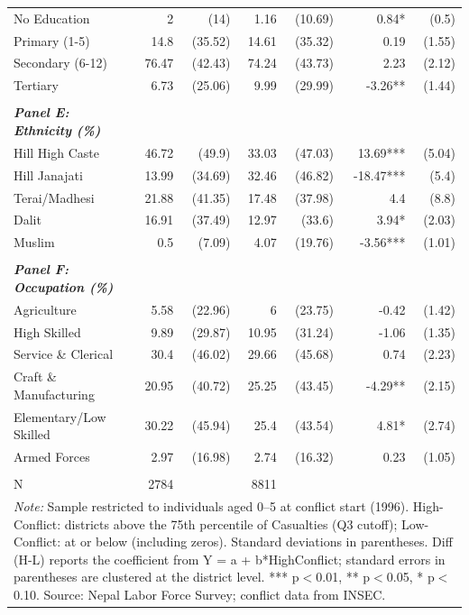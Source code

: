 \begin{landscape}
\begin{table}[!h]
{\begin{tabular}[t]{lrrrrrr}
No Education & 2 & (14) & 1.16 & (10.69) & 0.84* & (0.5)\\
Primary (1-5) & 14.8 & (35.52) & 14.61 & (35.32) & 0.19 & (1.55)\\
\addlinespace
Secondary (6-12) & 76.47 & (42.43) & 74.24 & (43.73) & 2.23 & (2.12)\\
Tertiary & 6.73 & (25.06) & 9.99 & (29.99) & -3.26** & (1.44)\\
 &  &  &  &  &  & \\
\em{\textbf{Panel E: Ethnicity (\%)}} & \em{\textbf{}} & \em{\textbf{}} & \em{\textbf{}} & \em{\textbf{}} & \em{\textbf{}} & \em{\textbf{}}\\
Hill High Caste & 46.72 & (49.9) & 33.03 & (47.03) & 13.69*** & (5.04)\\
\addlinespace
Hill Janajati & 13.99 & (34.69) & 32.46 & (46.82) & -18.47*** & (5.4)\\
Terai/Madhesi & 21.88 & (41.35) & 17.48 & (37.98) & 4.4 & (8.8)\\
Dalit & 16.91 & (37.49) & 12.97 & (33.6) & 3.94* & (2.03)\\
Muslim & 0.5 & (7.09) & 4.07 & (19.76) & -3.56*** & (1.01)\\
 &  &  &  &  &  & \\
\addlinespace
\em{\textbf{Panel F: Occupation (\%)}} & \em{\textbf{}} & \em{\textbf{}} & \em{\textbf{}} & \em{\textbf{}} & \em{\textbf{}} & \em{\textbf{}}\\
Agriculture & 5.58 & (22.96) & 6 & (23.75) & -0.42 & (1.42)\\
High Skilled & 9.89 & (29.87) & 10.95 & (31.24) & -1.06 & (1.35)\\
Service \& Clerical & 30.4 & (46.02) & 29.66 & (45.68) & 0.74 & (2.23)\\
Craft \& Manufacturing & 20.95 & (40.72) & 25.25 & (43.45) & -4.29** & (2.15)\\
\addlinespace
Elementary/Low Skilled & 30.22 & (45.94) & 25.4 & (43.54) & 4.81* & (2.74)\\
Armed Forces & 2.97 & (16.98) & 2.74 & (16.32) & 0.23 & (1.05)\\
 &  &  &  &  &  & \\
N & 2784 &  & 8811 &  &  & \\
\bottomrule
\multicolumn{7}{l}{\rule{0pt}{1em}\textit{Note: } Sample restricted to individuals aged 0--5 at conflict start (1996). High-Conflict: districts above the 75th percentile of Casualties (Q3 cutoff); Low-Conflict: at or below (including zeros). Standard deviations in parentheses. Diff (H-L) reports the coefficient from Y = a + b*HighConflict; standard errors in parentheses are clustered at the district level. *** p$<$0.01, ** p$<$0.05, * p$<$0.10. Source: Nepal Labor Force Survey; conflict data from INSEC.}\\
\end{tabular}}
\end{table}
\end{landscape}
